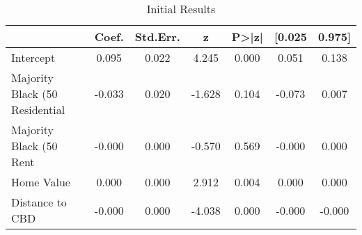 \begin{table}[h]
\centering
\caption{Initial Results}
\label{tab:initial_results}
\begin{tabular}{lcccccc}
\toprule
 & Coef. & Std.Err. & z & P>|z| & [0.025 & 0.975] \\
\midrule
Intercept & 0.095 & 0.022 & 4.245 & 0.000 & 0.051 & 0.138 \\
Majority Black (50%
Residential & -0.033 & 0.020 & -1.628 & 0.104 & -0.073 & 0.007 \\
Majority Black (50%
Rent & -0.000 & 0.000 & -0.570 & 0.569 & -0.000 & 0.000 \\
Home Value & 0.000 & 0.000 & 2.912 & 0.004 & 0.000 & 0.000 \\
Distance to CBD & -0.000 & 0.000 & -4.038 & 0.000 & -0.000 & -0.000 \\
\bottomrule
\end{tabular}
\end{table}
